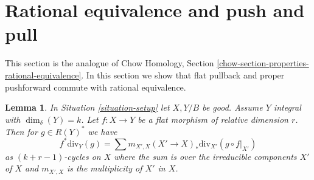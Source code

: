 \documentclass{stacks-project}
\theoremstyle{plain}
\newtheorem{lemma}[subsection]{Lemma}
\theoremstyle{definition}
\theoremstyle{remark}
\numberwithin{equation}{subsection}
\begin{document}
\section{Rational equivalence and push and pull}
\label{section-properties-rational-equivalence}

\noindent
This section is the analogue of
Chow Homology, Section \ref{chow-section-properties-rational-equivalence}.
In this section we show that flat pullback and proper pushforward
commute with rational equivalence.

\begin{lemma}
\label{lemma-prepare-flat-pullback-rational-equivalence}
In Situation \ref{situation-setup} let $X, Y/B$ be good.
Assume $Y$ integral with $\dim_\delta(Y) = k$.
Let $f : X \to Y$ be a flat morphism of
relative dimension $r$. Then for $g \in R(Y)^*$ we have
$$
f^*\text{div}_Y(g) =
\sum m_{X', X} (X' \to X)_*\text{div}_{X'}(g \circ f|_{X'})
$$
as $(k + r - 1)$-cycles on $X$ where the sum is over the irreducible
components $X'$ of $X$ and $m_{X', X}$ is the multiplicity of $X'$ in $X$.
\end{lemma}
\end{document}
